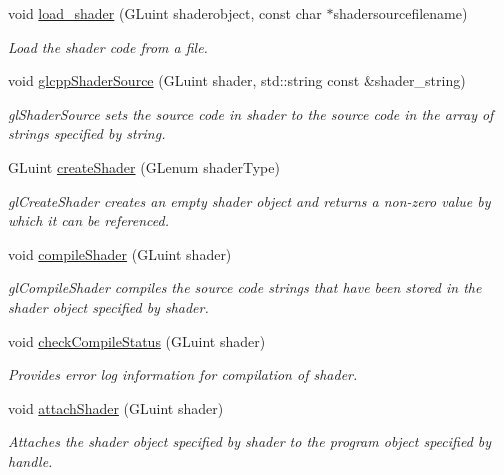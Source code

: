 \begin{DoxyCompactItemize}
void \hyperlink{class_g_l_s_l_program_afe85e8fe71e8b906f72ca3858531fa39}{load\+\_\+shader} (G\+Luint shaderobject, const char $\ast$shadersourcefilename)
\begin{DoxyCompactList}\small\item\em Load the shader code from a file. \end{DoxyCompactList}\item 
void \hyperlink{class_g_l_s_l_program_ae34d52138ce5780b39a6396e68b90349}{glcpp\+Shader\+Source} (G\+Luint shader, std\+::string const \&shader\+\_\+string)
\begin{DoxyCompactList}\small\item\em gl\+Shader\+Source sets the source code in shader to the source code in the array of strings specified by string. \end{DoxyCompactList}\item 
G\+Luint \hyperlink{class_g_l_s_l_program_ae4fe65254ed23ef5fba32dd4b7a3bee2}{create\+Shader} (G\+Lenum shader\+Type)
\begin{DoxyCompactList}\small\item\em gl\+Create\+Shader creates an empty shader object and returns a non-\/zero value by which it can be referenced. \end{DoxyCompactList}\item 
void \hyperlink{class_g_l_s_l_program_ae1ebde6b1ea8269f37064adb8e6d857f}{compile\+Shader} (G\+Luint shader)
\begin{DoxyCompactList}\small\item\em gl\+Compile\+Shader compiles the source code strings that have been stored in the shader object specified by shader. \end{DoxyCompactList}\item 
void \hyperlink{class_g_l_s_l_program_a4eebc77a6efe271bbf5eba25e8a27b66}{check\+Compile\+Status} (G\+Luint shader)
\begin{DoxyCompactList}\small\item\em Provides error log information for compilation of shader. \end{DoxyCompactList}\item 
void \hyperlink{class_g_l_s_l_program_a4b09d65133e3d9495315c2db2fb9295d}{attach\+Shader} (G\+Luint shader)
\begin{DoxyCompactList}\small\item\em Attaches the shader object specified by shader to the program object specified by handle. \end{DoxyCompactList}\item 

\end{DoxyCompactItemize}
